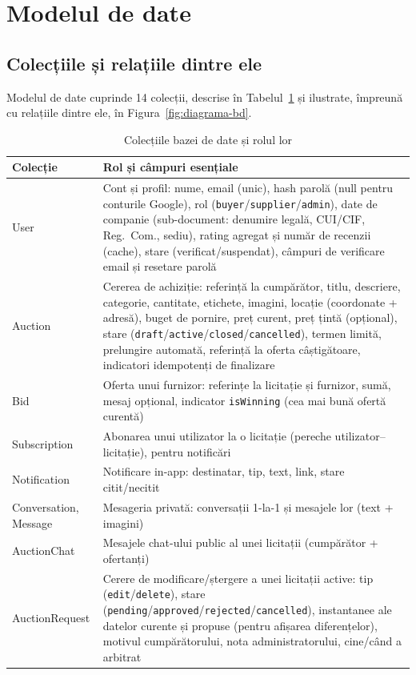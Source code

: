 \section{Modelul de date}

\subsection{Colecțiile și relațiile dintre ele}

Modelul de date cuprinde 14 colecții, descrise în Tabelul~\ref{tab:colectii} și ilustrate, împreună cu relațiile dintre ele, în Figura~\ref{fig:diagrama-bd}.

\begin{table}[!ht]\small\linespread{1}
\centering
\caption{Colecțiile bazei de date și rolul lor}
\label{tab:colectii}
\begin{tabular}{l >{\raggedright\arraybackslash}p{11.4cm}}
\toprule
\textbf{Colecție} & \textbf{Rol și câmpuri esențiale} \\
\midrule
User & Cont și profil: nume, email (unic), hash parolă (null pentru conturile Google), rol (\texttt{buyer}/\texttt{supplier}/\texttt{admin}), date de companie (sub-document: denumire legală, CUI/CIF, Reg.\ Com., sediu), rating agregat și număr de recenzii (cache), stare (verificat/suspendat), câmpuri de verificare email și resetare parolă \\
Auction & Cererea de achiziție: referință la cumpărător, titlu, descriere, categorie, cantitate, etichete, imagini, locație (coordonate + adresă), buget de pornire, preț curent, preț țintă (opțional), stare (\texttt{draft}/\texttt{active}/\texttt{closed}/\texttt{cancelled}), termen limită, prelungire automată, referință la oferta câștigătoare, indicatori idempotenți de finalizare \\
Bid & Oferta unui furnizor: referințe la licitație și furnizor, sumă, mesaj opțional, indicator \texttt{isWinning} (cea mai bună ofertă curentă) \\
Subscription & Abonarea unui utilizator la o licitație (pereche utilizator--licitație), pentru notificări \\
Notification & Notificare in-app: destinatar, tip, text, link, stare citit/necitit \\
Conversation, Message & Mesageria privată: conversații 1-la-1 și mesajele lor (text + imagini) \\
AuctionChat & Mesajele chat-ului public al unei licitații (cumpărător + ofertanți) \\
AuctionRequest & Cerere de modificare/ștergere a unei licitații active: tip (\texttt{edit}/\texttt{delete}), stare (\texttt{pending}/\texttt{approved}/\texttt{rejected}/\texttt{cancelled}), instantanee ale datelor curente și propuse (pentru afișarea diferențelor), motivul cumpărătorului, nota administratorului, cine/când a arbitrat \\

\end{tabular}
\end{table}
